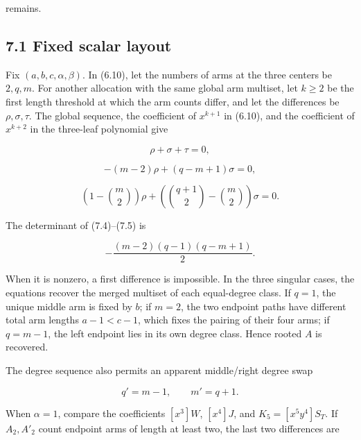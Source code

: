 \documentclass[11pt]{article}
\begin{document}
remains.

\Needspace{0.13\textheight}
\subsection*{7.1 Fixed scalar layout}


Fix $(a,b,c,\alpha,\beta)$. In (6.10), let the numbers of arms at the three centers be $2,q,m$.
For another allocation with the same global arm multiset, let $k\geq2$ be the first length threshold
at which the arm counts differ, and let the differences be $\rho,\sigma,\tau$. The global sequence,
the coefficient of $x^{k+1}$ in (6.10), and the coefficient of $x^{k+2}$ in the three-leaf
polynomial give

\begin{equation*}
\rho+\sigma+\tau=0,
\tag{7.3}
\end{equation*}


\begin{equation*}
-(m-2)\rho+(q-m+1)\sigma=0,
\tag{7.4}
\end{equation*}


\begin{equation*}
\left(1-\binom m2\right)\rho+
\left(\binom{q+1}2-\binom m2\right)\sigma=0.
\tag{7.5}
\end{equation*}


The determinant of (7.4)--(7.5) is

\begin{equation*}
-\frac{(m-2)(q-1)(q-m+1)}2.
\tag{7.6}
\end{equation*}


When it is nonzero, a first difference is impossible. In the three singular cases, the equations
recover the merged multiset of each equal-degree class. If $q=1$, the unique middle arm is fixed by
$b$; if $m=2$, the two endpoint paths have different total arm lengths $a-1<c-1$, which fixes the
pairing of their four arms; if $q=m-1$, the left endpoint lies in its own degree class. Hence rooted
$A$ is recovered.

The degree sequence also permits an apparent middle/right degree swap

\begin{equation*}
q'=m-1,\qquad m'=q+1.
\tag{7.7}
\end{equation*}


When $\alpha=1$, compare the coefficients $[x^3]W$, $[x^4]J$, and
$K_5=[x^5y^4]S_T$. If $A_2,A'_2$ count endpoint arms of length at least two, the last two
differences are
\end{document}
